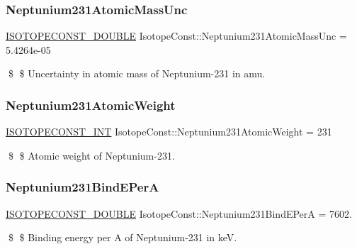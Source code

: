 \subsubsection{\texorpdfstring{Neptunium231\+Atomic\+Mass\+Unc}{Neptunium231AtomicMassUnc}}
{\footnotesize\ttfamily \mbox{\hyperlink{group___isotope_const-_macros_ga8f45a7272ce02c0b4c65c44636ed719a}{I\+S\+O\+T\+O\+P\+E\+C\+O\+N\+S\+T\+\_\+\+D\+O\+U\+B\+LE}} Isotope\+Const\+::\+Neptunium231\+Atomic\+Mass\+Unc = 5.\+4264e-\/05}

\$ \$ Uncertainty in atomic mass of Neptunium-\/231 in amu. \mbox{\label{group___isotope_const-_neptunium-_np231_gafabc6382bb56e729e382258650e540b3}} 
\subsubsection{\texorpdfstring{Neptunium231\+Atomic\+Weight}{Neptunium231AtomicWeight}}
{\footnotesize\ttfamily \mbox{\hyperlink{group___isotope_const-_macros_ga5f18360b3e99483a35c32d789e62621c}{I\+S\+O\+T\+O\+P\+E\+C\+O\+N\+S\+T\+\_\+\+I\+NT}} Isotope\+Const\+::\+Neptunium231\+Atomic\+Weight = 231}

\$ \$ Atomic weight of Neptunium-\/231. \mbox{\label{group___isotope_const-_neptunium-_np231_ga091988e76c589590aae80b564b6efd94}} 
\subsubsection{\texorpdfstring{Neptunium231\+Bind\+E\+PerA}{Neptunium231BindEPerA}}
{\footnotesize\ttfamily \mbox{\hyperlink{group___isotope_const-_macros_ga8f45a7272ce02c0b4c65c44636ed719a}{I\+S\+O\+T\+O\+P\+E\+C\+O\+N\+S\+T\+\_\+\+D\+O\+U\+B\+LE}} Isotope\+Const\+::\+Neptunium231\+Bind\+E\+PerA = 7602.}

\$ \$ Binding energy per A of Neptunium-\/231 in keV. \mbox{\label{group___isotope_const-_neptunium-_np231_gac78ec2ff0258e9d5047518c845cad456}} 
